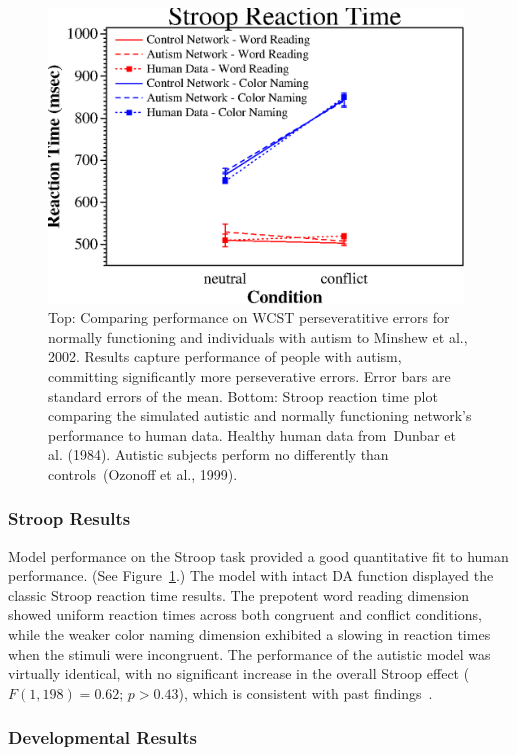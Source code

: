 \begin{figure}
\begin{center}
	\includegraphics[width=110mm]{graphs/stroop.ps}
\end{center}
\caption{Top: Comparing performance on WCST perseveratitive errors for normally functioning and individuals with autism to Minshew et al., 2002. Results capture performance of people with autism, committing significantly more perseverative errors. Error bars are standard errors of the mean.  Bottom: Stroop reaction time plot comparing the simulated autistic and normally functioning network's performance to human data. Healthy human data from~Dunbar et al. (1984).  Autistic subjects perform no differently than controls~(Ozonoff et al., 1999).} 
\label{wcst-figure}
\end{figure} 

\subsubsection{Stroop Results} 

Model performance on the Stroop task provided a good quantitative fit to human performance.  (See Figure~\ref{wcst-figure}.) The model with intact DA function displayed the classic Stroop reaction time results.  The prepotent word reading dimension showed uniform reaction times across both congruent and conflict conditions, while the weaker color naming dimension exhibited a slowing in reaction times when the stimuli were incongruent.  The performance of the autistic model was virtually identical, with no significant increase in the overall Stroop effect ($F(1,198) = 0.62$; $p > 0.43$), which is consistent with past findings~\cite{Ozonoff:1999:AutismStroopWCST}.


\subsubsection{Developmental Results}

